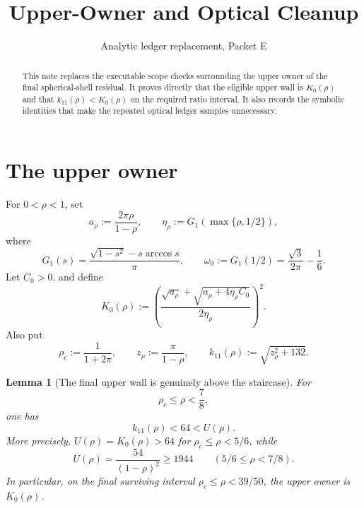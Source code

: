 \documentclass[11pt]{article}
\title{Upper-Owner and Optical Cleanup}
\author{}
\date{Analytic ledger replacement, Packet E}
\newtheorem{lemma}{Lemma}
\begin{document}
\maketitle

\begin{abstract}
This note replaces the executable scope checks surrounding the upper owner
of the final spherical-shell residual. It proves directly that the eligible
upper wall is \(K_0(\rho)\) and that
\(k_{11}(\rho)<K_0(\rho)\) on the required ratio interval. It also records
the symbolic identities that make the repeated optical ledger samples
unnecessary.
\end{abstract}

\section{The upper owner}

For \(0<\rho<1\), set
\[
 a_\rho:=\frac{2\pi\rho}{1-\rho},
 \qquad
 \eta_\rho:=G_1\!\left(\max\{\rho,1/2\}\right),
\]
where
\[
 G_1(s)=\frac{\sqrt{1-s^2}-s\arccos s}{\pi},
 \qquad
 \omega_0:=G_1(1/2)=\frac{\sqrt3}{2\pi}-\frac16.
\]
Let \(C_0>0\), and define
\begin{equation}
 K_0(\rho):=
 \left(
  \frac{\sqrt{a_\rho}+\sqrt{a_\rho+4\eta_\rho C_0}}
       {2\eta_\rho}
 \right)^2.
 \label{eq:K0}
\end{equation}
Also put
\[
 \rho_c:=\frac1{1+2\pi},
 \qquad z_\rho:=\frac\pi{1-\rho},
 \qquad k_{11}(\rho):=\sqrt{z_\rho^2+132}.
\]

\begin{lemma}[The final upper wall is genuinely above the staircase]
\label{lem:k11-K0}
For
\[
       \rho_c\leq\rho<\frac78,
\]
one has
\begin{equation}
       k_{11}(\rho)<64<U(\rho).
       \label{eq:k11-K0}
\end{equation}
More precisely, \(U(\rho)=K_0(\rho)>64\) for
\(\rho_c\leq\rho<5/6\), while
\[
 U(\rho)=\frac{54}{(1-\rho)^2}\geq1944
 \qquad(5/6\leq\rho<7/8).
\]
In particular, on the final surviving interval
\(\rho_c\leq\rho<39/50\), the upper owner is \(K_0(\rho)\).
\end{lemma}
\end{document}

